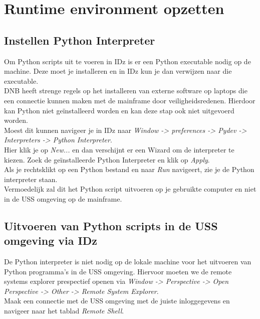 
\chapter{Runtime environment opzetten}
\label{ch:runtime-environment}
\section{Instellen Python Interpreter}
Om Python scripts uit te voeren in IDz is er een Python executable nodig op de machine. Deze moet je installeren en in IDz kun je dan verwijzen naar die executable. \\

DNB heeft strenge regels op het installeren van externe software op laptops die een connectie kunnen maken met de mainframe door veiligheidsredenen. Hierdoor kan Python niet geïnstalleerd worden en kan deze stap ook niet uitgevoerd worden. \\

Moest dit kunnen navigeer je in IDz naar \textit{Window -> preferences -> Pydev -> Interpreters -> Python Interpreter}. \\
Hier klik je op \textit{New...} en dan verschijnt er een Wizard om de interpreter te kiezen. Zoek de geïnstalleerde Python Interpreter en klik op \textit{Apply}. \\

Als je rechtsklikt op een Python bestand en naar \textit{Run} navigeert, zie je de Python interpreter staan. \\
Vermoedelijk zal dit het Python script uitvoeren op je gebruikte computer en niet in de USS omgeving op de mainframe. 


\section{Uitvoeren van Python scripts in de USS omgeving via IDz}
De Python interpreter is niet nodig op de lokale machine voor het uitvoeren van Python programma's in de USS omgeving. Hiervoor moeten we de remote systems explorer prespectief openen via \textit{Window -> Perspective -> Open Perspective -> Other -> Remote System Explorer}. \\

Maak een connectie met de USS omgeving met de juiste inloggegevens en navigeer naar het tablad \textit{Remote Shell}. \\

